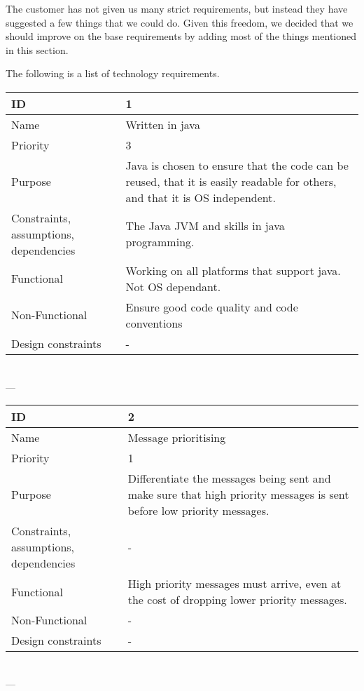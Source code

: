     The customer has not given us many strict requirements, but instead they have suggested a few things that we could do. Given this freedom, we decided that we should improve on the base requirements by adding most of the things mentioned in this section. 

    The following is a list of technology requirements. 

\begin{center}
    \begin{tabular}{| p{4cm} | p{8cm} |}
        \hline
        ID & 1 \\
        \hline
        Name & Written in java  \\
        \hline
        Priority & 3 \\
        \hline
        Purpose & Java is chosen to ensure that the code can be reused, that it is easily readable for others, and that it is OS independent. \\
        \hline 
        Constraints, assumptions, dependencies & The Java JVM and skills in java programming. \\
        \hline  
        Functional & Working on all platforms that support java. Not OS dependant. \\
        \hline
        Non-Functional & Ensure good code quality and code conventions \\ 
        \hline
        Design constraints & - \\
        \hline
    \end{tabular}
    \\  ---  \\
    
    \begin{tabular}{| p{4cm} | p{8cm} |}
        \hline
        ID & 2 \\
        \hline
        Name & Message prioritising \\
        \hline
        Priority & 1 \\
        \hline
        Purpose & Differentiate the messages being sent and make sure that high priority messages is sent before low priority messages. \\
        \hline 
        Constraints, assumptions, dependencies & -\\
        \hline  
        Functional & High priority messages must arrive, even at the cost of dropping lower priority messages.  \\
        \hline
        Non-Functional & - \\ 
        \hline
        Design constraints & - \\
        \hline
    \end{tabular}
    \\  ---  \\


\end{center}
